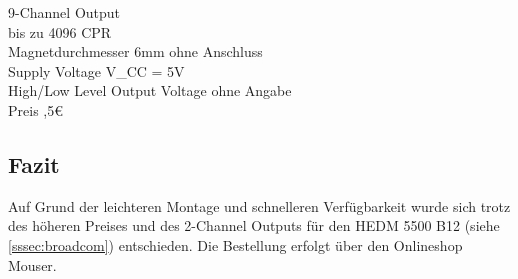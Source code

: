 \par\bigskip
\begin{benannteAuflistung}
    9-Channel Output \\
    bis zu 4096 CPR \\
    Magnetdurchmesser 6mm ohne Anschluss \\
    Supply Voltage V_{CC} = 5V \\
    High/Low Level Output Voltage ohne Angabe \\
    Preis ,5€
\end{benannteAuflistung}

\subsection{Fazit}
Auf Grund der leichteren Montage und schnelleren Verfügbarkeit wurde sich trotz des höheren Preises und des 2-Channel Outputs für den HEDM 5500 B12 (siehe \ref{sssec:broadcom}) entschieden. Die Bestellung erfolgt über den Onlineshop Mouser.